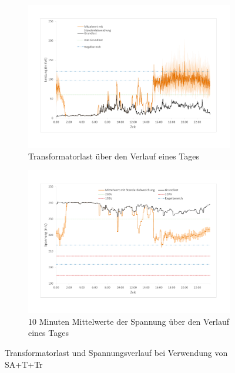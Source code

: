 \begin{figure}
	\begin{subfigure}{\linewidth}
		\includegraphics[scale=0.45]{img/SA_par_trafo/TrafoLast4.pdf}
		\caption{Transformatorlast über den Verlauf eines Tages}
		\label{Abb_SAparTrafo_TrafoLast}
	\end{subfigure}
	\begin{subfigure}{\linewidth}
		\includegraphics[scale=0.45]{img/SA_par_trafo/Voltage3.pdf}
		\caption{10 Minuten Mittelwerte der Spannung über den Verlauf eines Tages}
		\label{Abb_SaparTrafo_Spannung}
	\end{subfigure}
	\caption{Transformatorlast und Spannungsverlauf bei Verwendung von SA+T+Tr}
\end{figure}

